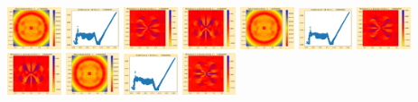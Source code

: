 \documentclass[11pt]{article}
\begin{document}
\includegraphics[width=0.11875\textwidth]{frame0027fig0.png}
\includegraphics[width=0.11875\textwidth]{frame0027fig1.png}
\includegraphics[width=0.11875\textwidth]{frame0027fig2.png}
\includegraphics[width=0.11875\textwidth]{frame0027fig3.png}
\vskip 10pt 
\includegraphics[width=0.11875\textwidth]{frame0028fig0.png}
\includegraphics[width=0.11875\textwidth]{frame0028fig1.png}
\includegraphics[width=0.11875\textwidth]{frame0028fig2.png}
\includegraphics[width=0.11875\textwidth]{frame0028fig3.png}
\includegraphics[width=0.11875\textwidth]{frame0029fig0.png}
\includegraphics[width=0.11875\textwidth]{frame0029fig1.png}
\includegraphics[width=0.11875\textwidth]{frame0029fig2.png}
\end{document}
